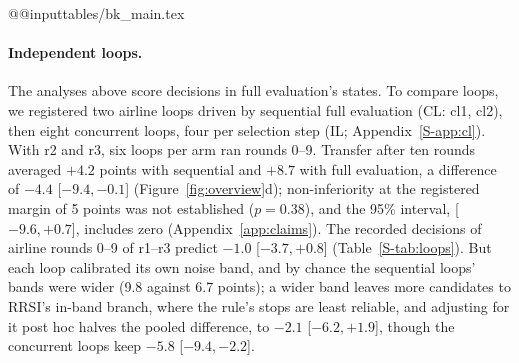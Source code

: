 \documentclass[11pt]{article}
\begin{document}
\begin{table}[t]
\centering\small
\setlength{\tabcolsep}{4pt}
\csname @@input\endcsname tables/bk_main.tex
\caption{Experiment BK (registered): transfer after ten rounds on airline (held-out success after round 9 minus the block's base, points, 20 tasks $\times$ 12 trials) of five loops in each of four blocks that share one calibrated noise band. Admission: the rule that decides acceptance; history: the estimates stopped candidates enter the proposer's history with. Acc.: changes accepted over the four blocks; Cand.\ ep.\ and Cost: candidate-evaluation episodes and dollar cost per loop, as if run alone, and their change against full evaluation. Contrasts: block means from the registered lineage model ($t$, Satterthwaite df) with the registered unadjusted 90\% and post hoc 95\% intervals, and in the last three columns a post hoc Holm $p$ over the five registered contrasts, one-sided in each registered reading's direction; main effects $(s+a-f-h)/2$ (admission) and $(s+h-f-a)/2$ (history).}
\label{tab:bk}
\end{table}

\paragraph{Independent loops.} The analyses above score decisions in full evaluation's states. To compare loops, we registered two airline loops driven by sequential full evaluation (CL: cl1, cl2), then eight concurrent loops, four per selection step (IL; Appendix~\ref*{S-app:cl}). With r2 and r3, six loops per arm ran rounds 0--9. Transfer after ten rounds averaged $+4.2$ points with sequential and $+8.7$ with full evaluation, a difference of $-4.4$ [$-9.4,-0.1$] (Figure~\ref{fig:overview}d); non-inferiority at the registered margin of 5 points was not established ($p=0.38$), and the 95\% interval, [$-9.6,+0.7$], includes zero (Appendix~\ref{app:claims}). The recorded decisions of airline rounds 0--9 of r1--r3 predict $-1.0$ [$-3.7,+0.8$] (Table~\ref*{S-tab:loops}). But each loop calibrated its own noise band, and by chance the sequential loops' bands were wider (9.8 against 6.7 points); a wider band leaves more candidates to RRSI's in-band branch, where the rule's stops are least reliable, and adjusting for it post hoc halves the pooled difference, to $-2.1$ [$-6.2,+1.9$], though the concurrent loops keep $-5.8$ [$-9.4,-2.2$].
\end{document}
